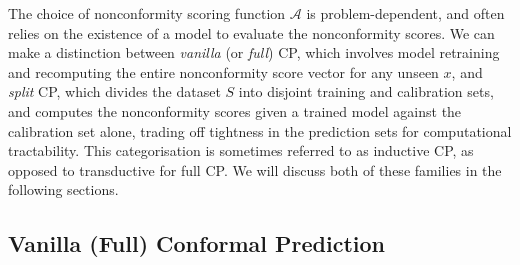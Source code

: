 The choice of nonconformity scoring function $\mathcal{A}$ is problem-dependent, and often relies on the existence of a model to evaluate the nonconformity scores. We can make a distinction between \textit{vanilla} (or \textit{full}) CP, which involves model retraining and recomputing the entire nonconformity score vector for any unseen $x$, and \textit{split} CP, which divides the dataset $S$ into disjoint training and calibration sets, and computes the nonconformity scores given a trained model against the calibration set alone, trading off tightness in the prediction sets for computational tractability. This categorisation is sometimes referred to as inductive CP, as opposed to transductive for full CP. We will discuss both of these families in the following sections.

\subsection{Vanilla (Full) Conformal Prediction}

